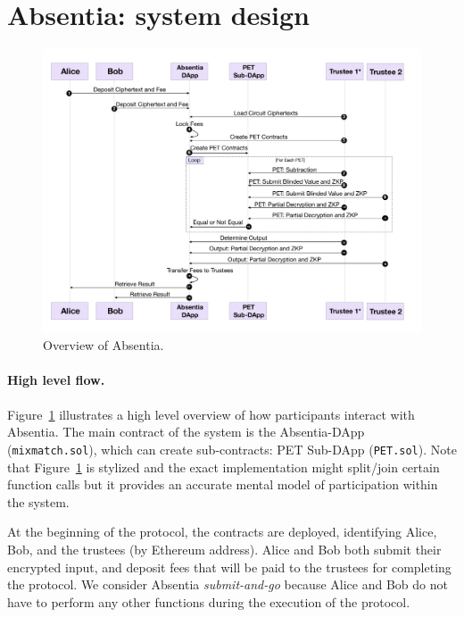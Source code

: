 
\section{Absentia: system design}
\label{sec:system}

\begin{figure}[t]
	\includegraphics[width=1\textwidth]{figures/absentia.pdf}
	\caption{Overview of Absentia.}
	\centering
	\label{fig:system}
\end{figure}


\paragraph{High level flow.} 
Figure~\ref{fig:system} illustrates a high level overview of how participants interact with Absentia. The main contract of the system is the Absentia-DApp (\texttt{mixmatch.sol}), which can create sub-contracts: PET Sub-DApp (\texttt{PET.sol}). Note that Figure~\ref{fig:system} is stylized and the exact implementation might split/join certain function calls but it provides an accurate mental model of participation within the system.

At the beginning of the protocol, the contracts are deployed, identifying Alice, Bob, and the trustees (by Ethereum address). Alice and Bob both submit their encrypted input, and deposit fees that will be paid to the trustees for completing the protocol. We consider Absentia \emph{submit-and-go} because Alice and Bob do not have to perform any other functions during the execution of the protocol. 
 
